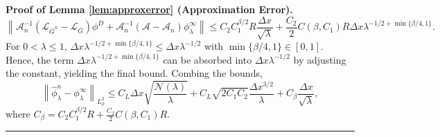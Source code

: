 \documentclass[12pt]{article}
\newenvironment{proof}[1][Proof]{\noindent\textbf{#1.} }{\ \rule{0.5em}{0.5em}}
\numberwithin{equation}{section}
\numberwithin{theorem}{section}
\begin{document}
\begin{proof}[Proof of Lemma \ref{lem:approxerror} (Approximation Error)]
$$
\left\|\mathcal{A}_n^{-1}\left(\mathcal{L}_{\bar{G}^n}-\mathcal{L}_{\bar{G}}\right) \phi^D+\mathcal{A}_n^{-1}\left(\mathcal{A}-\mathcal{A}_n\right) \phi_\lambda^{\infty}\right\| \leq C_2 C_1^{\beta / 2} R \frac{\Delta x}{\sqrt{\lambda}}+\frac{C_2}{2} C\left(\beta, C_1\right)R \Delta x \lambda^{-1 / 2+\min \{\beta / 4,1\}}.
$$
For $0<\lambda \leq 1$, $\Delta x \lambda^{-1 / 2+\min \{\beta / 4,1\}} \leq \Delta x \lambda^{-1 / 2}$ with $\min \{\beta / 4,1\} \in[0,1]$. Hence, the term $\Delta x \lambda^{-1 / 2+\min \{\beta / 4,1\}}$ can be absorbed into $\Delta x \lambda^{-1 / 2}$ by adjusting the constant, yielding the final bound. Combing the bounds,
$$
\left\|\hat{\phi}_\lambda^n-\phi_\lambda^{\infty}\right\|_{L_\rho^2} \leq C_L \Delta x \sqrt{\frac{\mathcal{N}(\lambda)}{\lambda}}+C_L \sqrt{2 C_1 C_2} \frac{\Delta x^{3 / 2}}{\lambda}+ C_\beta \frac{\Delta x}{\sqrt{\lambda}},
$$
where $C_\beta = C_2 C_1^{\beta / 2} R + \frac{C_2}{2} C\left(\beta, C_1\right)R$.
\end{proof}



\end{document}
